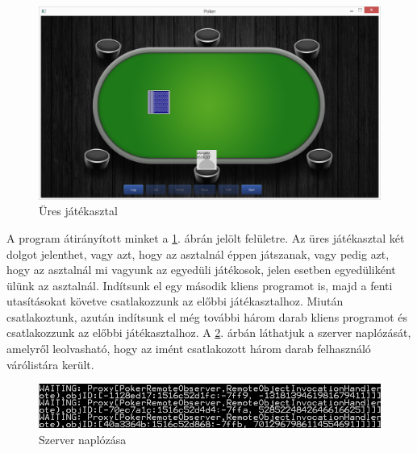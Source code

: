 \begin{figure}[h!]
  \caption{Üres játékasztal}
  \label{fig:parti_1}
  \centering
    \includegraphics[width=\linewidth]{user-documentation/images/parti/parti_1.jpg}
\end{figure}
A program átirányított minket a \ref{fig:parti_1}. ábrán jelölt felületre. Az üres játékasztal két dolgot jelenthet, vagy azt, hogy az asztalnál éppen játszanak, vagy pedig azt, hogy az asztalnál mi vagyunk az egyedüli játékosok, jelen esetben egyedüliként ülünk az asztalnál. Indítsunk el egy második kliens programot is, majd a fenti utasításokat követve csatlakozzunk az előbbi játékasztalhoz. Miután csatlakoztunk, azután indítsunk el még további három darab kliens programot és csatlakozzunk az előbbi játékasztalhoz. A \ref{fig:sv_log}. árbán láthatjuk a szerver naplózását, amelyről leolvasható, hogy az imént csatlakozott három darab felhasználó várólistára került. \\
\begin{figure}[h!]
  \caption{Szerver naplózása}
  \label{fig:sv_log}
  \centering
    \includegraphics[width=\linewidth]{user-documentation/images/sv_log.jpg}
\end{figure}

